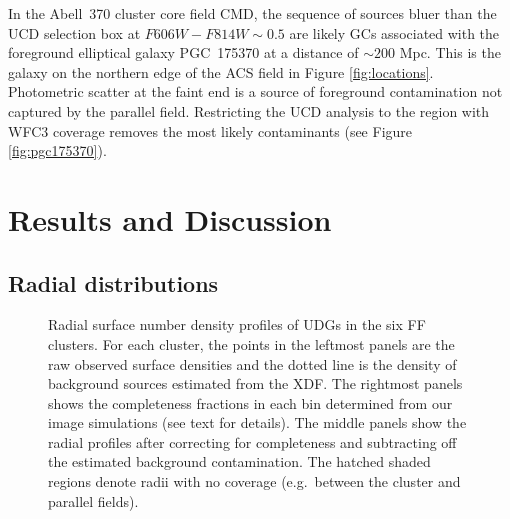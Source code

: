 \documentclass[iop,tighten,twocolumn,apj,floatfix]{emulateapj}
\begin{document}
In the Abell~370 cluster core field CMD, the sequence of sources bluer than the
UCD selection box at $F606W-F814W \sim 0.5$ are likely GCs associated with the
foreground elliptical galaxy PGC~175370 at a distance of ${\sim}200$ Mpc.
This is the galaxy on the northern edge of the ACS field in Figure
\ref{fig:locations}.
Photometric scatter at the faint end is a source of foreground contamination
not captured by the parallel field.
Restricting the UCD analysis to the region with WFC3 coverage removes the most
likely contaminants (see Figure \ref{fig:pgc175370}).

\section{Results and Discussion}\label{sec:results}

\subsection{Radial distributions}

\begin{figure*}
	\caption{
    Radial surface number density profiles of UDGs in the six FF clusters.
    For each cluster, the points in the leftmost panels are the raw observed surface
    densities and the dotted line is the density of background sources
    estimated from the XDF.
    The rightmost panels shows the completeness fractions in each bin
    determined from our image simulations (see text for details).
    The middle panels show the radial profiles after correcting for
    completeness and subtracting off the estimated background contamination.
    The hatched shaded regions denote radii with no coverage (e.g.\ between the
    cluster and parallel fields).
    \label{fig:radial-profiles}
	}
\end{figure*}
\end{document}
